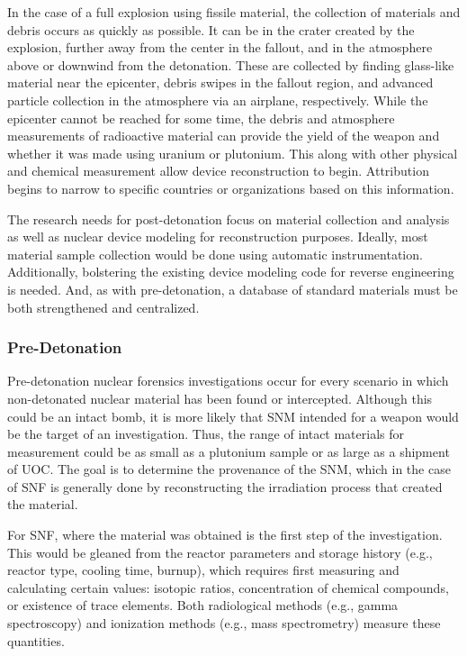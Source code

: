 In the case of a full explosion using fissile material, the collection of
materials and debris occurs as quickly as possible.  It can be in the crater
created by the explosion, further away from the center in the fallout, and in
the atmosphere above or downwind from the detonation. These are collected by
finding glass-like material near the epicenter, debris swipes in the fallout
region, and advanced particle collection in the atmosphere via an airplane,
respectively.  While the epicenter cannot be reached for some time, the debris
and atmosphere measurements of radioactive material can provide the yield of
the weapon and whether it was made using uranium or plutonium. This along with
other physical and chemical measurement allow device reconstruction to begin.
Attribution begins to narrow to specific countries or organizations based on
this information. \cite{aps_aaas_forensics}

The research needs for post-detonation focus on material collection and
analysis as well as nuclear device modeling for reconstruction purposes.
Ideally, most material sample collection would be done using automatic
instrumentation.  Additionally, bolstering the existing device modeling code
for reverse engineering is needed.  And, as with pre-detonation, a database of
standard materials must be both strengthened and centralized.
\cite{aps_aaas_forensics}

\subsubsection{Pre-Detonation}
\label{sec:predet}

Pre-detonation nuclear forensics investigations occur for every scenario in
which non-detonated nuclear material has been found or intercepted. Although
this could be an intact bomb, it is more likely that \gls{SNM} intended for a
weapon would be the target of an investigation. Thus, the range of intact
materials for measurement could be as small as a plutonium sample or as large
as a shipment of \gls{UOC}.  The goal is to determine the provenance of the
\gls{SNM}, which in the case of \gls{SNF} is generally done by reconstructing
the irradiation process that created the material. 

For \gls{SNF}, where the material was obtained is the first step of the
investigation. This would be gleaned from the reactor parameters and storage
history (e.g., reactor type, cooling time, burnup), which requires first
measuring and calculating certain values: isotopic ratios, concentration of
chemical compounds, or existence of trace elements.  Both radiological methods
(e.g., gamma spectroscopy) and ionization methods (e.g., mass spectrometry)
measure these quantities.  

